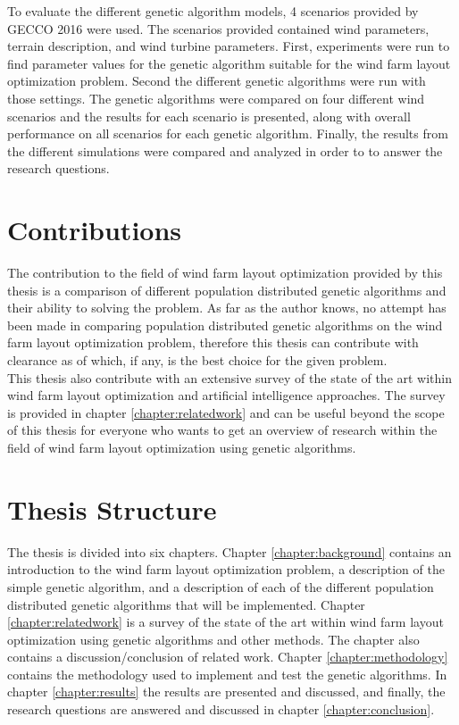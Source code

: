 \noindent To evaluate the different genetic algorithm models, 4 scenarios provided by GECCO 2016 were used. The scenarios provided contained wind parameters, terrain description, and wind turbine parameters. First, experiments were run to find parameter values for the genetic algorithm suitable for the wind farm layout optimization problem. Second the different genetic algorithms were run with those settings. The genetic algorithms were compared on four different wind scenarios and the results for each scenario is presented, along with overall performance on all scenarios for each genetic algorithm. Finally, the results from the different simulations were compared and analyzed in order to to answer the research questions.


\section{Contributions}\label{section:introduction contributions}
The contribution to the field of wind farm layout optimization provided by this thesis is a comparison of different population distributed genetic algorithms and their ability to solving the problem. As far as the author knows, no attempt has been made in comparing population distributed genetic algorithms on the wind farm layout optimization problem, therefore this thesis can contribute with clearance as of which, if any, is the best choice for the given problem.\\

\noindent This thesis also contribute with an extensive survey of the state of the art within wind farm layout optimization and artificial intelligence approaches. The survey is provided in chapter \ref{chapter:relatedwork} and can be useful beyond the scope of this thesis for everyone who wants to get an overview of research within the field of wind farm layout optimization using genetic algorithms.\\


\section{Thesis Structure}\label{thesisstructure}
The thesis is divided into six chapters. Chapter \ref{chapter:background} contains an introduction to the wind farm layout optimization problem, a description of the simple genetic algorithm, and a description of each of the different population distributed genetic algorithms that will be implemented. Chapter \ref{chapter:relatedwork} is a survey of the state of the art within wind farm layout optimization using genetic algorithms and other methods. The chapter also contains a discussion/conclusion of related work. Chapter \ref{chapter:methodology} contains the methodology used to implement and test the genetic algorithms. In chapter \ref{chapter:results} the results are presented and discussed, and finally, the research questions are answered and discussed in chapter \ref{chapter:conclusion}.